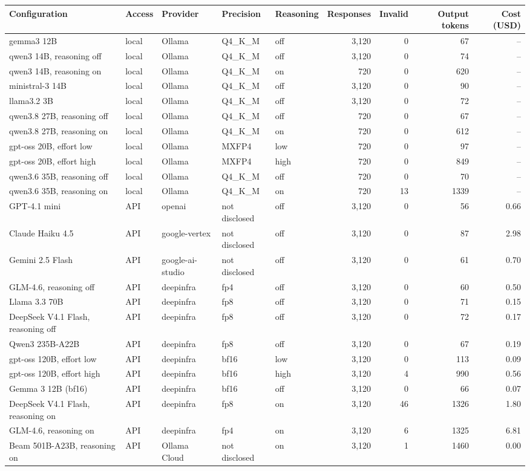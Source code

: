 \begin{tabular}{lllllrrrr}
\toprule
Configuration & Access & Provider & Precision & Reasoning & Responses & Invalid & Output tokens & Cost (USD) \\
\midrule
gemma3 12B & local & Ollama & Q4\_K\_M & off & 3,120 & 0 & 67 & -- \\
qwen3 14B, reasoning off & local & Ollama & Q4\_K\_M & off & 3,120 & 0 & 74 & -- \\
qwen3 14B, reasoning on & local & Ollama & Q4\_K\_M & on & 720 & 0 & 620 & -- \\
ministral-3 14B & local & Ollama & Q4\_K\_M & off & 3,120 & 0 & 90 & -- \\
llama3.2 3B & local & Ollama & Q4\_K\_M & off & 3,120 & 0 & 72 & -- \\
qwen3.8 27B, reasoning off & local & Ollama & Q4\_K\_M & off & 720 & 0 & 67 & -- \\
qwen3.8 27B, reasoning on & local & Ollama & Q4\_K\_M & on & 720 & 0 & 612 & -- \\
gpt-oss 20B, effort low & local & Ollama & MXFP4 & low & 720 & 0 & 97 & -- \\
gpt-oss 20B, effort high & local & Ollama & MXFP4 & high & 720 & 0 & 849 & -- \\
qwen3.6 35B, reasoning off & local & Ollama & Q4\_K\_M & off & 720 & 0 & 70 & -- \\
qwen3.6 35B, reasoning on & local & Ollama & Q4\_K\_M & on & 720 & 13 & 1339 & -- \\
GPT-4.1 mini & API & openai & not disclosed & off & 3,120 & 0 & 56 & 0.66 \\
Claude Haiku 4.5 & API & google-vertex & not disclosed & off & 3,120 & 0 & 87 & 2.98 \\
Gemini 2.5 Flash & API & google-ai-studio & not disclosed & off & 3,120 & 0 & 61 & 0.70 \\
GLM-4.6, reasoning off & API & deepinfra & fp4 & off & 3,120 & 0 & 60 & 0.50 \\
Llama 3.3 70B & API & deepinfra & fp8 & off & 3,120 & 0 & 71 & 0.15 \\
DeepSeek V4.1 Flash, reasoning off & API & deepinfra & fp8 & off & 3,120 & 0 & 72 & 0.17 \\
Qwen3 235B-A22B & API & deepinfra & fp8 & off & 3,120 & 0 & 67 & 0.19 \\
gpt-oss 120B, effort low & API & deepinfra & bf16 & low & 3,120 & 0 & 113 & 0.09 \\
gpt-oss 120B, effort high & API & deepinfra & bf16 & high & 3,120 & 4 & 990 & 0.56 \\
Gemma 3 12B (bf16) & API & deepinfra & bf16 & off & 3,120 & 0 & 66 & 0.07 \\
DeepSeek V4.1 Flash, reasoning on & API & deepinfra & fp8 & on & 3,120 & 46 & 1326 & 1.80 \\
GLM-4.6, reasoning on & API & deepinfra & fp4 & on & 3,120 & 6 & 1325 & 6.81 \\
Beam 501B-A23B, reasoning on & API & Ollama Cloud & not disclosed & on & 3,120 & 1 & 1460 & 0.00 \\
\bottomrule
\end{tabular}
